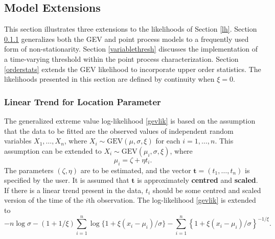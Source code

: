 \documentclass[11pt,a4paper]{article}
\newcommand{\bs}{\boldsymbol}
\begin{document}
\subsection{Model Extensions}
\label{extend}

This section illustrates three extensions to the likelihoods of Section \ref{lh}.
Section \ref{lineartrend} generalizes both the GEV and point process models to a frequently used form of non-stationarity.
Section \ref{variablethresh} discusses the implementation of a time-varying threshold within the point process characterization.
Section \ref{orderstats} extends the GEV likelihood to incorporate upper order statistics.
The likelihoods presented in this section are defined by continuity when $\xi = 0$.

\subsubsection{Linear Trend for Location Parameter}
\label{lineartrend}

The generalized extreme value log-likelihood \eqref{gevlik} is based on the assumption that the data to be fitted are the observed values of independent random variables $X_1,\dots,X_n$, where $X_i \sim \text{GEV}(\mu,\sigma,\xi)$ for each $i=1,\dots,n$.
This assumption can be extended to $X_i \sim \text{GEV}(\mu_i,\sigma,\xi)$, where
\begin{equation*}
\mu_i = \zeta + \eta t_i.
\end{equation*}
The parameters $(\zeta,\eta)$ are to be estimated, and the vector $\bs{t}=(t_1,\dots,t_n)$ is specified by the user.
It is assumed that $\bs{t}$ is approximately \textbf{centred} and \textbf{scaled}.
If there is a linear trend present in the data, $t_i$ should be some centred and scaled version of the time of the $i$th observation.
The log-likelihood \eqref{gevlik} is extended to
\begin{equation*}
-n\log \sigma - (1 + 1/\xi) \sum_{i=1}^n \log\{1+ \xi \left( x_i-\mu_i \right) /\sigma\} - \sum_{i=1}^n  \left\{ 1 + \xi \left( x_i-\mu_i \right) /\sigma  \right\}^{-1/\xi}.
\end{equation*}
\end{document}
